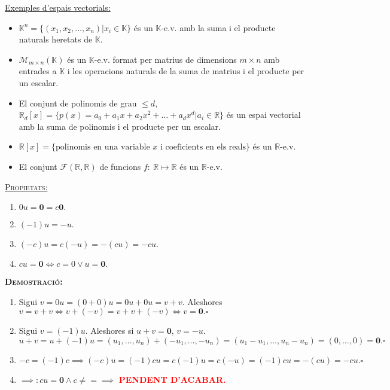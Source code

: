\documentclass[11pt]{article}
\newcommand{\fieldk}{\mathbb{K}}
\newcommand{\demostracio}{\textbf{{\scshape Demostració:}}\\}
\newcommand{\pendent}{\textcolor{red}{\textbf{PENDENT D'ACABAR.}}}
\begin{document}
\underline{Exemples d'espais vectorials:}
\begin{itemize}
	\item $\mathbb{K}^n=\{(x_1,x_2,\ldots,x_n)|x_i\in\mathbb{K}\}$ és un $\mathbb{K}$-e.v. amb la suma i el producte naturals heretats de $\mathbb{K}$.
	\item $\mathcal{M}_{m\times n}(\mathbb{K})$ és un $\fieldk$-e.v. format per matrius de dimensions $m\times n$ amb entrades a $\fieldk$ i les operacions naturals de la suma de matrius i el producte per un escalar.
	\item El conjunt de polinomis de grau $\leq d$, $\mathbb{R}_d[x]=\{p(x)=a_0+a_1x+a_2x^2+\ldots+a_dx^d|a_i\in\mathbb{R}\}$ és un espai vectorial amb la suma de polinomis i el producte per un escalar.
	\item $\mathbb{R}[x]=\{\textrm{polinomis en una variable }x\textrm{ i coeficients en els reals}\}$ és un $\mathbb{R}$-e.v.
	\item El conjunt $\mathcal{F}(\mathbb{R},\mathbb{R})$ de funcions $f: \ \mathbb{R}\mapsto\mathbb{R}$ és un $\mathbb{R}$-e.v.
\end{itemize}
\underline{{\scshape Propietats:}}
\begin{enumerate}
	\item $0u=\textbf{0}=c\textbf{0}.$
	\item $(-1)u=-u.$
	\item $(-c)u=c(-u)=-(cu)=-cu.$
	\item $cu=\textbf{0}\iff c=0\vee u=\textbf{0}.$
\end{enumerate}
\demostracio
\begin{enumerate}
	\item Sigui $v=0u=(0+0)u=0u+0u=v+v$. Aleshores $v=v+v\iff v+(-v)=v+v+(-v)\iff v=\textbf{0}.\square$
	\item Sigui $v=(-1)u$. Aleshores si $u+v=\textbf{0}$, $v=-u$.
	$$u+v=u+(-1)u=(u_1,\ldots,u_n)+(-u_1,\ldots,-u_n)=(u_1-u_1,\ldots,u_n-u_n)=(0,\ldots,0)=\textbf{0}.\square$$
	\item $-c=(-1)c \implies (-c)u=(-1)cu=c(-1)u=c(-u)=(-1)cu=-(cu)=-cu.\square$
	\item $\implies: cu=\textbf{0} \wedge c\neq = \implies$ \pendent
\end{enumerate}

\newpage
\end{document}
